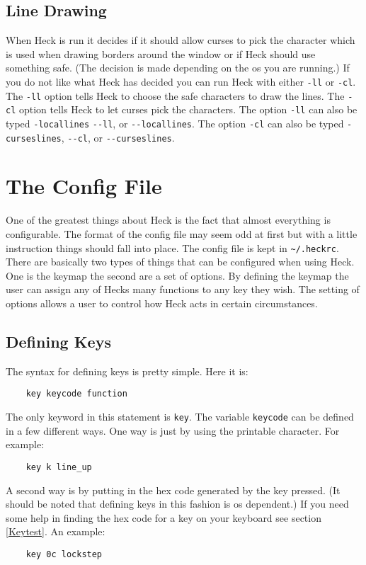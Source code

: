 \documentclass[12pt]{article}
\begin{document}
\subsection{Line Drawing}
When Heck is run it decides if it should allow curses to pick the character
which is used when drawing borders around the window or if Heck should use 
something safe.  (The decision is made depending on the os you are running.) 
If you do not like what Heck has decided you can run Heck with either
\verb#-ll# or \verb#-cl#.  The \verb#-ll# option tells Heck to choose the 
safe characters to draw the lines.  The \verb#-cl# option tells Heck to let 
curses pick the characters.  The option \verb#-ll# can also be typed 
\verb#-locallines# \verb#--ll#, or \verb#--locallines#.  The option \verb#-cl# 
can also be typed \verb#-curseslines#, \verb#--cl#, or \verb#--curseslines#.

\section{The Config File}
One of the greatest things about Heck is the fact that almost everything is
configurable.  The format of the config file may seem odd at first but with
a little instruction things should fall into place.  The config file is kept 
in \verb#~/.heckrc#. There are basically two types of things that can
be configured when using Heck.  One is the keymap the second are a set of
options.  By defining the keymap the user can assign any of Hecks many 
functions to any key they wish.  The setting of options allows a user to
control how Heck acts in certain circumstances.

\subsection{Defining Keys}
The syntax for defining keys is pretty simple.  Here it is:
\begin{verbatim}
    key keycode function
\end{verbatim}

The only keyword in this statement is \verb#key#.  The variable \verb#keycode# 
can be defined in a few different ways.  One way is just by using the printable
character. For example:
\begin{verbatim}
    key k line_up 
\end{verbatim}

A second way is by putting in the hex code generated by the key pressed.  
(It should be noted that defining keys in this fashion is os dependent.)
If you need some help in finding the hex code for a key on your keyboard
see section \ref{Keytest}.
An example:
\begin{verbatim}
    key 0c lockstep 
\end{verbatim}
\end{document}

